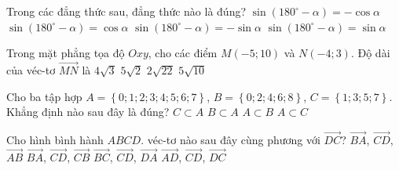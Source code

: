 	\begin{ex}[0H1Y1-3]%
		Trong các đẳng thức sau, đẳng thức nào là đúng?
		\choice
		{$\sin\left(180^{\circ} -\alpha\right)=-\cos\alpha$}
		{$\sin\left(180^{\circ} -\alpha\right)=\cos\alpha$}
		{$\sin\left(180^{\circ} -\alpha\right)=-\sin\alpha$}
		{\True $\sin\left(180^{\circ} -\alpha\right)=\sin\alpha$}
	\end{ex}

	\begin{ex}[0H3B2-3]%
		Trong mặt phẳng tọa độ $Oxy$, cho các điểm $M(-5;10)$ và $N(-4;3)$. Độ dài của véc-tơ $\overrightarrow{MN}$ là
		\choice
		{$4\sqrt{3}$}
		{\True $5\sqrt{2}$}
		{$2\sqrt{22}$}
		{$5\sqrt{10}$}
	\end{ex}

	\begin{ex}[0D1B2-2]%
		Cho ba tập hợp $A=\left\lbrace 0;1;2;3;4;5;6;7\right\rbrace$, $B=\left\lbrace 0;2;4;6;8\right\rbrace$, $C=\left\lbrace 1;3;5;7\right\rbrace$. Khẳng định nào sau đây là đúng?
		\choice
		{\True $C\subset A$}
		{$B\subset A$}
		{$A\subset B$}
		{$A\subset C$}
	\end{ex}

	\begin{ex}[0H2Y1-2]%
		Cho hình bình hành $ABCD$. véc-tơ nào sau đây cùng phương với $\overrightarrow{DC}$?
		\choice
		{\True $\overrightarrow{BA}$, $\overrightarrow{CD}$, $\overrightarrow{AB}$}
		{$\overrightarrow{BA}$, $\overrightarrow{CD}$, $\overrightarrow{CB}$}
		{$\overrightarrow{BC}$, $\overrightarrow{CD}$, $\overrightarrow{DA}$}
		{$\overrightarrow{AD}$, $\overrightarrow{CD}$, $\overrightarrow{DC}$}
	\end{ex}
	
